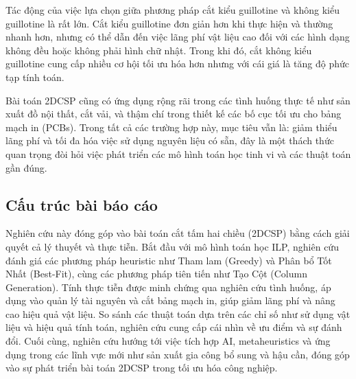 Tác động của việc lựa chọn giữa phương pháp cắt kiểu guillotine và không kiểu guillotine là rất lớn. Cắt kiểu guillotine đơn giản hơn khi thực hiện và thường nhanh hơn, nhưng có thể dẫn đến việc lãng phí vật liệu cao đối với các hình dạng không đều hoặc không phải hình chữ nhật. Trong khi đó, cắt không kiểu guillotine cung cấp nhiều cơ hội tối ưu hóa hơn nhưng với cái giá là tăng độ phức tạp tính toán.

Bài toán 2DCSP cũng có ứng dụng rộng rãi trong các tình huống thực tế như sản xuất đồ nội thất, cắt vải, và thậm chí trong thiết kế các bố cục tối ưu cho bảng mạch in (PCBs). Trong tất cả các trường hợp này, mục tiêu vẫn là: giảm thiểu lãng phí và tối đa hóa việc sử dụng nguyên liệu có sẵn, đây là một thách thức quan trọng đòi hỏi việc phát triển các mô hình toán học tinh vi và các thuật toán gần đúng.

\subsection{Cấu trúc bài báo cáo}

\hspace{0.5cm}Nghiên cứu này đóng góp vào bài toán cắt tấm hai chiều (2DCSP) bằng cách giải quyết cả lý thuyết và thực tiễn. Bắt đầu với mô hình toán học ILP, nghiên cứu đánh giá các phương pháp heuristic như Tham lam (Greedy) và Phân bổ Tốt Nhất (Best-Fit), cùng các phương pháp tiên tiến như Tạo Cột (Column Generation). Tính thực tiễn được minh chứng qua nghiên cứu tình huống, áp dụng vào quản lý tài nguyên và cắt bảng mạch in, giúp giảm lãng phí và nâng cao hiệu quả vật liệu. So sánh các thuật toán dựa trên các chỉ số như sử dụng vật liệu và hiệu quả tính toán, nghiên cứu cung cấp cái nhìn về ưu điểm và sự đánh đổi. Cuối cùng, nghiên cứu hướng tới việc tích hợp AI, metaheuristics và ứng dụng trong các lĩnh vực mới như sản xuất gia công bổ sung và hậu cần, đóng góp vào sự phát triển bài toán 2DCSP trong tối ưu hóa công nghiệp.